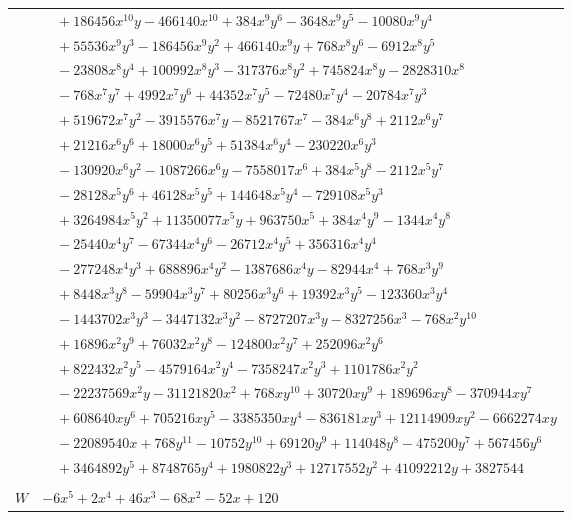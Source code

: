 \documentclass[11pt]{article}
\begin{document}
\begin{longtable}{@{}ll@{}}
 & $\quad +186456x^{10}y-466140x^{10}+384x^{9}y^{6}-3648x^{9}y^{5}-10080x^{9}y^{4}$\\
 & $\quad +55536x^{9}y^{3}-186456x^{9}y^{2}+466140x^{9}y+768x^{8}y^{6}-6912x^{8}y^{5}$\\
 & $\quad -23808x^{8}y^{4}+100992x^{8}y^{3}-317376x^{8}y^{2}+745824x^{8}y-2828310x^{8}$\\
 & $\quad -768x^{7}y^{7}+4992x^{7}y^{6}+44352x^{7}y^{5}-72480x^{7}y^{4}-20784x^{7}y^{3}$\\
 & $\quad +519672x^{7}y^{2}-3915576x^{7}y-8521767x^{7}-384x^{6}y^{8}+2112x^{6}y^{7}$\\
 & $\quad +21216x^{6}y^{6}+18000x^{6}y^{5}+51384x^{6}y^{4}-230220x^{6}y^{3}$\\
 & $\quad -130920x^{6}y^{2}-1087266x^{6}y-7558017x^{6}+384x^{5}y^{8}-2112x^{5}y^{7}$\\
 & $\quad -28128x^{5}y^{6}+46128x^{5}y^{5}+144648x^{5}y^{4}-729108x^{5}y^{3}$\\
 & $\quad +3264984x^{5}y^{2}+11350077x^{5}y+963750x^{5}+384x^{4}y^{9}-1344x^{4}y^{8}$\\
 & $\quad -25440x^{4}y^{7}-67344x^{4}y^{6}-26712x^{4}y^{5}+356316x^{4}y^{4}$\\
 & $\quad -277248x^{4}y^{3}+688896x^{4}y^{2}-1387686x^{4}y-82944x^{4}+768x^{3}y^{9}$\\
 & $\quad +8448x^{3}y^{8}-59904x^{3}y^{7}+80256x^{3}y^{6}+19392x^{3}y^{5}-123360x^{3}y^{4}$\\
 & $\quad -1443702x^{3}y^{3}-3447132x^{3}y^{2}-8727207x^{3}y-8327256x^{3}-768x^{2}y^{10}$\\
 & $\quad +16896x^{2}y^{9}+76032x^{2}y^{8}-124800x^{2}y^{7}+252096x^{2}y^{6}$\\
 & $\quad +822432x^{2}y^{5}-4579164x^{2}y^{4}-7358247x^{2}y^{3}+1101786x^{2}y^{2}$\\
 & $\quad -22237569x^{2}y-31121820x^{2}+768xy^{10}+30720xy^{9}+189696xy^{8}-370944xy^{7}$\\
 & $\quad +608640xy^{6}+705216xy^{5}-3385350xy^{4}-836181xy^{3}+12114909xy^{2}-6662274xy$\\
 & $\quad -22089540x+768y^{11}-10752y^{10}+69120y^{9}+114048y^{8}-475200y^{7}+567456y^{6}$\\
 & $\quad +3464892y^{5}+8748765y^{4}+1980822y^{3}+12717552y^{2}+41092212y+3827544$\\
\addlinespace[3pt]
\multicolumn{2}{@{}l}{$i=27$, $m=1$, neighbours $36,0,1,5,6,8,15,17,22,33$}\\
$W$ & $-6x^{5}+2x^{4}+46x^{3}-68x^{2}-52x+120$\\

\end{longtable}
\end{document}
